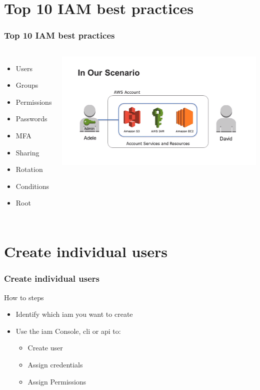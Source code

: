 \documentclass{beamer}
\begin{document}
\section{Top 10 IAM best practices}
\begin{frame}[fragile]
\frametitle{Top 10 IAM best practices}
\begin{columns}
\begin{itemize}
 \item Users
 \item Groups
 \item Permissions
 \item Passwords
 \item MFA
 \item Sharing
 \item Rotation
 \item Conditions
 \item Root
\end{itemize}
 \includegraphics[width= 1.0 \textwidth]{scenario.png}
\end{columns}
\end{frame}
\section{Create individual users}
\begin{frame}[fragile]
\frametitle{Create individual users}
How to steps
\begin{itemize}
 \item Identify which \acrshort{iam} you want to create
 \item Use the \acrshort{iam} Console, \acrfull{cli} or \acrfull{api} to:
  \begin{itemize}
 \item Create user
 \item Assign credentials
 \item Assign Permissions
\end{itemize}
\end{itemize}
\end{frame}
\end{document}
